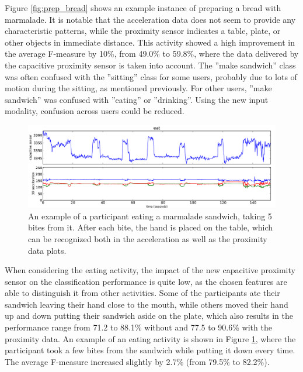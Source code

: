 \documentclass[runningheads,a4paper]{llncs}
\begin{document}
Figure \ref{fig:prep_bread} shows an example instance of preparing a bread with marmalade. It is notable that the acceleration data does not seem to provide any characteristic patterns, while the proximity sensor indicates a table, plate, or other objects in immediate distance. This activity showed a high improvement in the average F-measure by 10\%, from 49.0\% to 59.8\%, where the data delivered by the capacitive proximity sensor is taken into account. The ''make sandwich'' class was often confused with the ''sitting'' class for some users, probably due to lots of motion during the sitting, as mentioned previously. For other users, ''make sandwich'' was confused with ''eating'' or ''drinking''. Using the new input modality, confusion across users could be reduced.

\begin{figure}[h]
	\centering
		\includegraphics[width=\textwidth]{../Auswertung/images/eugen_6.pdf}
	\caption{An example of a participant eating a marmalade sandwich, taking 5 bites from it. After each bite, the hand is placed on the table, which can be recognized both in the acceleration as well as the proximity data plots.}
	\label{fig:eating}
\end{figure}

When considering the eating activity, the impact of the new capacitive proximity sensor on the classification performance is quite low, as the chosen features are able to distinguish it from other activities. Some of the participants ate their sandwich leaving their hand close to the mouth, while others moved their hand up and down putting their sandwich aside on the plate, which also results in the performance range from 71.2 to 88.1\% without and 77.5 to 90.6\% with the proximity data. An example of an eating activity is shown in Figure \ref{fig:eating}, where the participant took a few bites from the sandwich while putting it down every time. The average F-measure increased slightly by 2.7\% (from 79.5\% to 82.2\%). 
\end{document}
